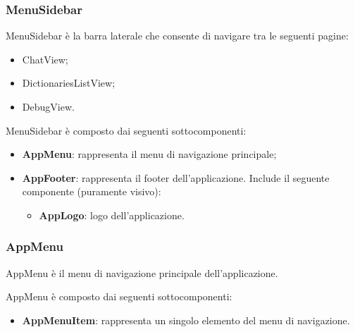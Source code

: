 \subsubsection{MenuSidebar}

\par MenuSidebar è la barra laterale che consente di navigare tra le seguenti pagine:
\begin{itemize}
  \item ChatView;
  \item DictionariesListView;
  \item DebugView.
\end{itemize}

\par MenuSidebar è composto dai seguenti sottocomponenti:
\begin{itemize}
  \item \textbf{AppMenu}: rappresenta il menu di navigazione principale;
  \item \textbf{AppFooter}: rappresenta il footer dell'applicazione. Include il seguente componente (puramente visivo):
  \begin{itemize}
    \item \textbf{AppLogo}: logo dell'applicazione.
  \end{itemize}
\end{itemize}

\subsubsection{AppMenu}

\par AppMenu è il menu di navigazione principale dell'applicazione.

\par AppMenu è composto dai seguenti sottocomponenti:
\begin{itemize}
  \item \textbf{AppMenuItem}: rappresenta un singolo elemento del menu di navigazione.
\end{itemize}